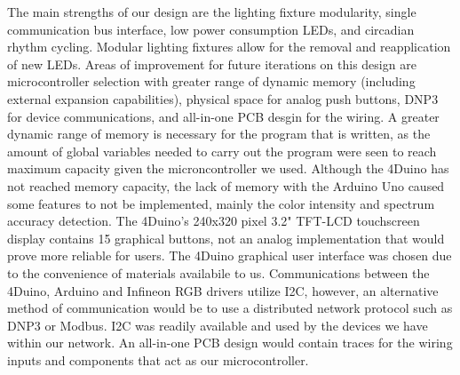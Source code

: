 \documentclass[12pt,a4paper]{report}
\begin{document}
The main strengths of our design are the lighting fixture modularity, single communication bus interface, low power consumption LEDs, and circadian rhythm cycling. Modular lighting fixtures allow for the removal and reapplication of new LEDs. 
Areas of improvement for future iterations on this design are microcontroller selection with greater range of dynamic memory (including external expansion capabilities), physical space for analog push buttons, DNP3 for device communications, and all-in-one PCB desgin for the wiring. A greater dynamic range of memory is necessary for the program that is written, as the amount of global variables needed to carry out the program were seen to reach maximum capacity given the microncontroller we used. Although the 4Duino has not reached memory capacity, the lack of memory with the Arduino Uno caused some features to not be implemented, mainly the color intensity and spectrum accuracy detection. The 4Duino's 240x320 pixel 3.2" TFT-LCD touchscreen display contains 15 graphical buttons, not an analog implementation that would prove more reliable for users. The 4Duino graphical user interface was chosen due to the convenience of materials availabile to us. Communications between the 4Duino, Arduino and Infineon RGB drivers utilize I2C, however, an alternative method of communication would be to use a distributed network protocol such as DNP3 or Modbus. I2C was readily available and used by the devices we have within our network. An all-in-one PCB design would contain traces for the wiring inputs and components that act as our microcontroller. \\
\end{document}
